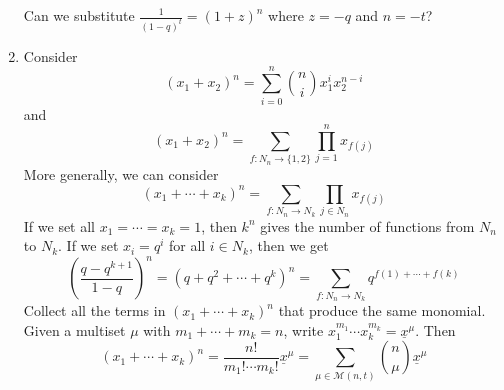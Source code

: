 \documentclass[11pt, a4paper]{memoir}
\theoremstyle{change}
\theoremstyle{plain}
\theoremstyle{nonumberplain}
\numberwithin{equation}{section}
\begin{document}
\begin{enumerate}
        Can we substitute $\frac{1}{(1-q)^t}=(1+z)^n$ where $z=-q$ and $n=-t$?
    \item Consider
        \begin{equation*}
            (x_1+x_2)^n = \sum_{i=0}^n\binom{n}{i}x_1^ix_2^{n-i}
        \end{equation*}
        and
        \begin{equation*}
            (x_1+x_2)^n = \sum_{f:N_n\to\{1,2\}}\prod_{j=1}^n x_{f(j)}
        \end{equation*}
        More generally, we can consider
        \begin{equation*}
            (x_1+\cdots+x_k)^n = \sum_{f:N_n\to N_k}\prod_{j\in N_n}x_{f(j)}
        \end{equation*}
        If we set all $x_1=\cdots=x_k=1$, then $k^n$ gives the number of functions from $N_n$ to $N_k$.
        If we set $x_i=q^i$ for all $i\in N_k$, then we get
        \begin{equation*}
            \left(\frac{q-q^{k+1}}{1-q}\right)^n =(q+q^2+\cdots+q^k)^n = \sum_{f:N_n\to N_k}q^{f(1)+\cdots+f(k)}
        \end{equation*}
        Collect all the terms in $(x_1+\cdots+x_k)^n$ that produce the same monomial.
        Given a multiset $\mu$ with $m_1+\cdots+m_k=n$, write $x_1^{m_1}\cdots x_k^{m_k}=\underline{x}^\mu$.
        Then
        \begin{equation*}
            (x_1+\cdots+x_k)^n =\frac{n!}{m_1!\cdots m_k!}\underline{x}^\mu= \sum_{\mu\in \mathcal{M}(n,t)}\binom{n}{\mu}\underline{x}^\mu
        \end{equation*}


\end{enumerate}
\end{document}
